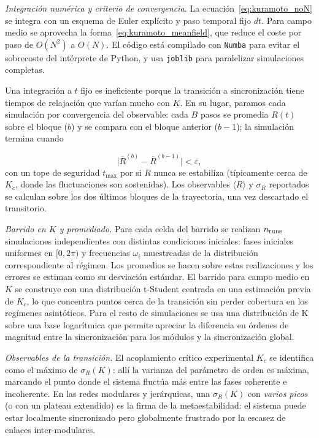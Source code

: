 \documentclass[
  reprint,
  amsmath,amssymb,
  aps,
  pra,
]{revtex4-2}
\begin{document}
\textit{Integración numérica y criterio de convergencia.}\;
La ecuación~\eqref{eq:kuramoto_noN} se integra con un esquema de Euler explícito y paso temporal fijo \(dt\). Para campo medio se aprovecha la forma~\eqref{eq:kuramoto_meanfield}, que reduce el coste por paso de \(O(N^2)\) a \(O(N)\). El código está compilado con \texttt{Numba} para evitar el sobrecoste del intérprete de Python, y usa \texttt{joblib} para paralelizar simulaciones completas.

Una integración a \(t\) fijo es ineficiente porque la transición a sincronización tiene tiempos de relajación que varían mucho con \(K\). En su lugar, paramos cada simulación por convergencia del observable: cada \(B\) pasos se promedia \(R(t)\) sobre el bloque ($b$) y se compara con el bloque anterior ($b-1$); la simulación termina cuando

\begin{equation}
  \bigl|\overline{R}^{(b)} - \overline{R}^{(b-1)}\bigr| < \varepsilon,
  \label{eq:conv}
\end{equation}
con un tope de seguridad \(t_{\max}\) por si \(R\) nunca se estabiliza (típicamente cerca de \(K_c\), donde las fluctuaciones son sostenidas). Los observables \(\langle R\rangle\) y \(\sigma_R\) reportados se calculan sobre los dos últimos bloques de la trayectoria, una vez descartado el transitorio.

\textit{Barrido en \(K\) y promediado.}\;
Para cada celda del barrido se realizan \(n_{\rm runs}\) simulaciones independientes con distintas condiciones iniciales: fases iniciales uniformes en \([0,2\pi)\) y frecuencias \(\omega_i\) muestreadas de la distribución correspondiente al régimen. Los promedios se hacen sobre estas realizaciones y los errores se estiman como su desviación estándar. El barrido para campo medio en \(K\) se construye con una distribución t-Student centrada en una estimación previa de \(K_c\), lo que concentra puntos cerca de la transición sin perder cobertura en los regímenes asintóticos. Para el resto de simulaciones se usa una distribución de K sobre una base logarítmica que permite apreciar la diferencia en órdenes de magnitud entre la sincronización para los módulos y la sincronización global.

\textit{Observables de la transición.}\;
El acoplamiento crítico experimental \(K_c\) se identifica como el máximo de \(\sigma_R(K)\): allí la varianza del parámetro de orden es máxima, marcando el punto donde el sistema fluctúa más entre las fases coherente e incoherente. En las redes modulares y jerárquicas, una \(\sigma_R(K)\) con \textit{varios picos} (o con un plateau extendido) es la firma de la metaestabilidad: el sistema puede estar localmente sincronizado pero globalmente frustrado por la escasez de enlaces inter-modulares.
\end{document}
